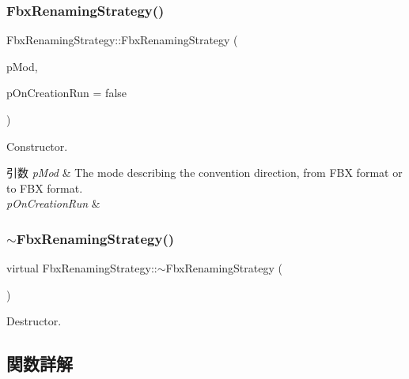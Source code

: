 \subsubsection{\texorpdfstring{Fbx\+Renaming\+Strategy()}{FbxRenamingStrategy()}}
{\footnotesize\ttfamily Fbx\+Renaming\+Strategy\+::\+Fbx\+Renaming\+Strategy (\begin{DoxyParamCaption}\item[{\hyperlink{class_fbx_renaming_strategy_a68099d97d087f66edd2ea873e0dbf423}{E\+Direction}}]{p\+Mod,  }\item[{bool}]{p\+On\+Creation\+Run = {\ttfamily false} }\end{DoxyParamCaption})}

Constructor. 
\begin{DoxyParams}{引数}
{\em p\+Mod} & The mode describing the convention direction, from F\+BX format or to F\+BX format. \\
\hline
{\em p\+On\+Creation\+Run} & \\
\hline
\end{DoxyParams}
\mbox{\label{class_fbx_renaming_strategy_a3d041932b649c5b69b29d156574bece1}} 
\subsubsection{\texorpdfstring{$\sim$\+Fbx\+Renaming\+Strategy()}{~FbxRenamingStrategy()}}
{\footnotesize\ttfamily virtual Fbx\+Renaming\+Strategy\+::$\sim$\+Fbx\+Renaming\+Strategy (\begin{DoxyParamCaption}{ }\end{DoxyParamCaption})\hspace{0.3cm}{\ttfamily [virtual]}}



Destructor. 



\subsection{関数詳解}
\mbox{\label{class_fbx_renaming_strategy_a87b1e89413d7b8c86a9d8a9f6fa6490f}} 
